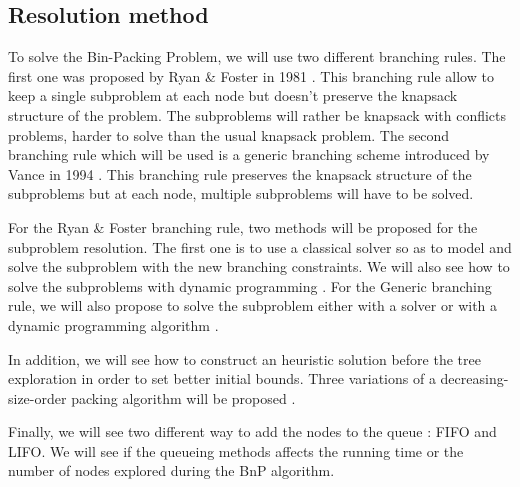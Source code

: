 \subsection{Resolution method}

To solve the Bin-Packing Problem, we will use two different branching rules. The first one was proposed by Ryan \& Foster in 1981 \cite{ryan1981rn}. This branching rule allow to keep a single subproblem at each node but doesn't preserve the knapsack structure of the problem. The subproblems will rather be knapsack with conflicts problems, harder to solve than the usual knapsack problem. The second branching rule which will be used is a generic branching scheme introduced by Vance in 1994 \cite{vance1994solving}. This branching rule preserves the knapsack structure of the subproblems but at each node, multiple subproblems will have to be solved.

For the Ryan \& Foster branching rule, two methods will be proposed for the subproblem resolution. The first one is to use a classical solver so as to model and solve the subproblem with the new branching constraints. We will also see how to solve the subproblems with dynamic programming \cite{toth1980dynamic}. For the Generic branching rule, we will also propose to solve the subproblem either with a solver or with a dynamic programming algorithm \cite{sadykov2013bin}.

In addition, we will see how to construct an heuristic solution before the tree exploration in order to set better initial bounds. Three  variations of a decreasing-size-order packing algorithm will be proposed \cite{bhatia2009better}. 

Finally, we will see two different way to add the nodes to the queue : FIFO and LIFO. We will see if the queueing methods affects the running time or the number of nodes explored during the BnP algorithm. 